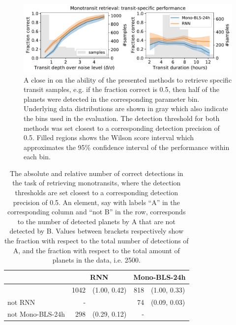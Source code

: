 \begin{figure}
    \centering
    \includegraphics[width=0.7\linewidth]{Experiments/Figures/Monos/mono_transit_specific.pdf}
    \caption{A close in on the ability of the presented methods to retrieve specific transit samples, e.g. if the fraction correct is 0.5, then half of the planets were detected in the corresponding parameter bin. Underlying data distributions are shown in gray which also indicate the bins used in the evaluation. The detection threshold for both methods was set closest to a corresponding detection precision of 0.5. Filled regions shows the Wilson score interval \citep{wilson1927probable} which approximates the 95\% confidence interval of the performance within each bin.}
    \label{fig:mono_transits}
\end{figure}

\begin{table}[]
\label{tab:mono_AnotB}
\centering
\begin{tabular}{@{}lrlrl@{}}
\toprule
                 & \multicolumn{2}{c}{RNN} & \multicolumn{2}{c}{Mono-BLS-24h} \\ \midrule
                 & 1042   & (1.00, 0.42)   & 818        & (1.00, 0.33)        \\
not RNN          & -      &                & 74         & (0.09, 0.03)        \\
not Mono-BLS-24h & 298    & (0.29, 0.12)   & -          &                     \\ \bottomrule
\end{tabular}
\caption{The absolute and relative number of correct detections in the task of retrieving monotransits, where the detection thresholds are set closest to a corresponding detection precision of 0.5. An element, say with labels ``A'' in the corresponding column and ``not B'' in the row, corresponds to the number of detected planets by A that are not detected by B. Values between brackets respectively show the fraction with respect to the total number of detections of A, and the fraction with respect to the total amount of planets in the data, i.e. 2500.}
\end{table}
